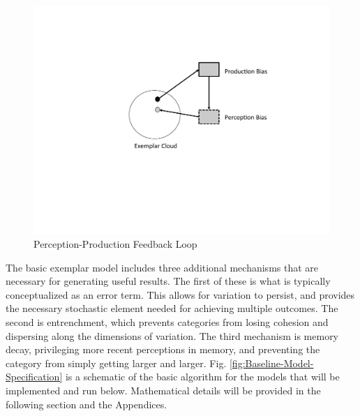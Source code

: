 \begin{figure}[H]

\begin{centering}
\includegraphics[scale=0.5]{figures/P-PLoop.pdf}\caption{\label{fig:Feedback Loop}Perception-Production Feedback Loop}
\par\end{centering}
\end{figure}

The basic exemplar model includes three additional mechanisms that
are necessary for generating useful results. The first of these is
what is typically conceptualized as an error term. This allows for
variation to persist, and provides the necessary stochastic element
needed for achieving multiple outcomes. The second is entrenchment,
which prevents categories from losing cohesion and dispersing along
the dimensions of variation. The third mechanism is memory decay,
privileging more recent perceptions in memory, and preventing the
category from simply getting larger and larger. Fig. \ref{fig:Baseline-Model-Specification}
is a schematic of the basic algorithm for the models that will be
implemented and run below. Mathematical details will be provided in
the following section and the Appendices. 

